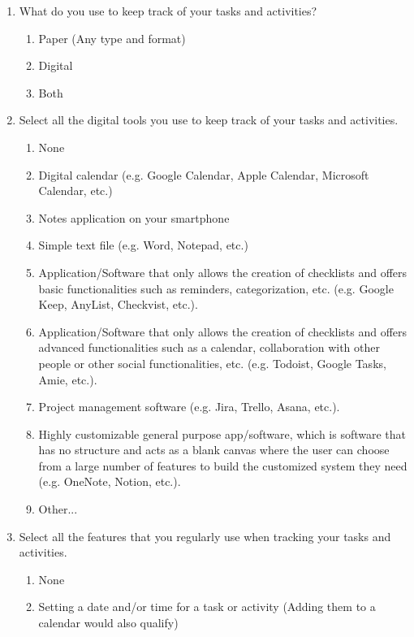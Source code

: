 \begin{enumerate}
    \item What do you use to keep track of your tasks and activities?
        \begin{enumerate}
            \item Paper (Any type and format)
            \item Digital
            \item Both
        \end{enumerate}
    \item Select all the digital tools you use to keep track of your tasks and activities.
        \begin{enumerate}
            \item None
            \item Digital calendar (e.g. Google Calendar, Apple Calendar, Microsoft Calendar, etc.)
            \item Notes application on your smartphone
            \item Simple text file (e.g. Word, Notepad, etc.)
            \item Application/Software that only allows the creation of checklists and offers basic functionalities such as reminders, categorization, etc. (e.g. Google Keep, AnyList, Checkvist, etc.).
            \item Application/Software that only allows the creation of checklists and offers advanced functionalities such as a calendar, collaboration with other people or other social functionalities, etc. (e.g. Todoist, Google Tasks, Amie, etc.).
            \item Project management software (e.g. Jira, Trello, Asana, etc.).
            \item Highly customizable general purpose app/software, which is software that has no structure and acts as a blank canvas where the user can choose from a large number of features to build the customized system they need (e.g. OneNote, Notion, etc.).
            \item Other...
        \end{enumerate}
    \item Select all the features that you regularly use when tracking your tasks and activities.
        \begin{enumerate}
            \item None
            \item Setting a date and/or time for a task or activity (Adding them to a calendar would also qualify)

\end{enumerate}
\end{enumerate}
